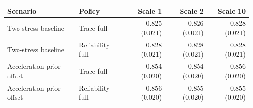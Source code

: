 \begin{tabular}{llrrr}
\toprule
Scenario & Policy & Scale 1 & Scale 2 & Scale 10 \\
\midrule
Two-stress baseline & Trace-full & 0.825 (0.021) & 0.826 (0.021) & 0.828 (0.021) \\
Two-stress baseline & Reliability-full & 0.828 (0.021) & 0.828 (0.021) & 0.828 (0.021) \\
Acceleration prior offset & Trace-full & 0.854 (0.020) & 0.854 (0.020) & 0.856 (0.020) \\
Acceleration prior offset & Reliability-full & 0.856 (0.020) & 0.855 (0.020) & 0.855 (0.020) \\
\bottomrule
\end{tabular}

